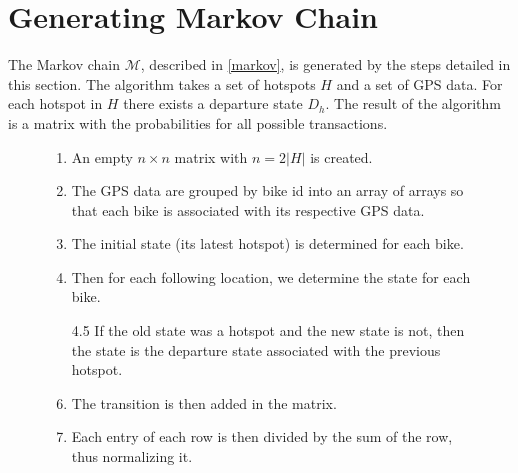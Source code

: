 \section{Generating Markov Chain}\label{sec:generatemarkov}
The Markov chain $\mathcal{M}$, described in \cref{markov}, is generated by the steps detailed in this section.
The algorithm takes a set of hotspots $H$ and a set of GPS data. For each hotspot in $H$ there exists a departure state $D_h$.
The result of the algorithm is a matrix with the probabilities for all possible transactions.

\begin{figure}
\begin{enumerate}
\item An empty $n \times n$ matrix with $n = 2|H|$ is created.
\item The GPS data are grouped by bike id into an array of arrays so that each bike is associated with its respective GPS data.
\item The initial state (its latest hotspot) is determined for each bike.
\item Then for each following location, we determine the state for each bike.
\item[4.5] If the old state was a hotspot and the new state is not, then the state is the departure state associated with the previous hotspot.
\item The transition is then added in the matrix.
\item Each entry of each row is then divided by the sum of the row, thus normalizing it.
\end{enumerate}
\label{enum:markov}
\end{figure}